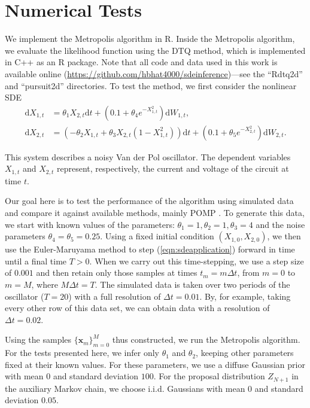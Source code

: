 \documentclass[graybox]{svmult}
\begin{document}
\section{Numerical Tests}
\label{sec:3}
We implement the Metropolis algorithm in R. Inside the Metropolis algorithm, we evaluate the likelihood function using the DTQ method, which is implemented in C++ as an R package. Note that all code and data used in this work is available online (\url{https://github.com/hbhat4000/sdeinference})---see the ``Rdtq2d'' and ``pursuit2d'' directories.
To test the method, we first consider the nonlinear SDE
\begin{subequations}
\label{eqn:sdeapplication}
\begin{align}
\mathrm{d}X_{1,t} & =  \theta_1 X_{2,t} \mathrm{d}t + (0.1 + \theta_4 e^{-X_{1,t}^2}) \mathrm{d}W_{1,t}, \\
\mathrm{d}X_{2,t} & = (-\theta_2 X_{1,t} + \theta_3 X_{2,t} (1 - X_{1,t}^2)) \mathrm{d}t + (0.1 + \theta_5 e^{-X_{2,t}^2}) \mathrm{d}W_{2,t}.
\end{align}
\end{subequations}

This system describes a noisy Van der Pol oscillator. The dependent variables $X_{1,t}$ and $X_{2,t}$ represent, respectively, the current and voltage of the circuit at time $t$.

Our goal here is to test the performance of the algorithm using simulated data and compare it against available methods, mainly POMP \cite{king2016statistical}. To generate this data, we start with known values of the parameters: $\theta_1 = 1, \theta_2 = 1, \theta_3 = 4$ and the noise parameters $\theta_4 =  \theta_5 = 0.25$. Using a fixed initial condition $(X_{1,0},X_{2,0})$, we then use the Euler-Maruyama method to step (\ref{eqn:sdeapplication}) forward in time until a final time $T > 0$. When we carry out this time-stepping, we use a step size of $0.001$ and then retain only those samples at times $t_m = m \Delta t$, from $m = 0$ to $m = M$, where $M \Delta t = T$. The simulated data is taken over two periods of the oscillator ($T = 20$) with a full resolution of $\Delta t = 0.01$. By, for example, taking every other row of this data set, we can obtain data with a resolution of $\Delta t = 0.02$.

Using the samples $\{ \mathbf{x}_m \}_{m=0}^M$ thus constructed, we run the Metropolis algorithm. For the tests presented here, we infer only $\theta_1$ and $\theta_2$, keeping other parameters fixed at their known values. For these parameters, we use a diffuse Gaussian prior with mean $0$ and standard deviation $100$. For the proposal distribution $Z_{N+1}$ in the auxiliary Markov chain, we choose i.i.d. Gaussians with mean $0$ and standard deviation $0.05$.
\end{document}
